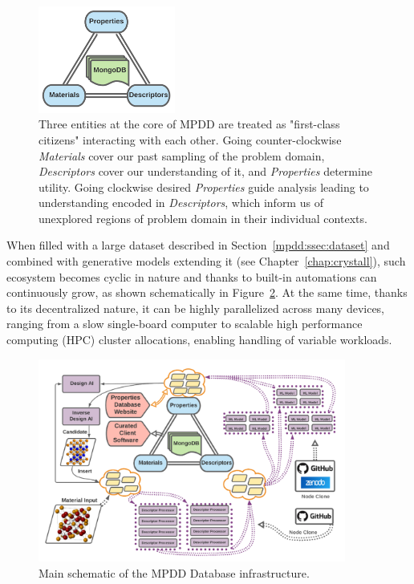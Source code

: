 \begin{figure}[H]
    \centering
    \includegraphics[width=0.4\textwidth]{mpdd/MPDD_CoreTriplet.png}
    \caption{Three entities at the core of MPDD are treated as "first-class citizens" interacting with each other. Going counter-clockwise \emph{Materials} cover our past sampling of the problem domain, \emph{Descriptors} cover our understanding of it, and \emph{Properties} determine utility. Going clockwise desired \emph{Properties} guide analysis leading to understanding encoded in \emph{Descriptors}, which inform us of unexplored regions of problem domain in their individual contexts.}
    \label{mpdd:fig:core}
\end{figure}

When filled with a large dataset described in Section~\ref{mpdd:ssec:dataset} and combined with generative models extending it (see Chapter~\ref{chap:crystall}), such ecosystem becomes cyclic in nature and thanks to built-in automations can continuously grow, as shown schematically in Figure~\ref{mpdd:fig:schematic}. At the same time, thanks to its decentralized nature, it can be highly parallelized across many devices, ranging from a slow single-board computer to scalable high performance computing (HPC) cluster allocations, enabling handling of variable workloads.


\begin{figure}[H]
    \centering
    \includegraphics[width=0.9\textwidth]{mpdd/Picture1.png}
    \caption{Main schematic of the MPDD Database infrastructure.}
    \label{mpdd:fig:schematic}
\end{figure}



